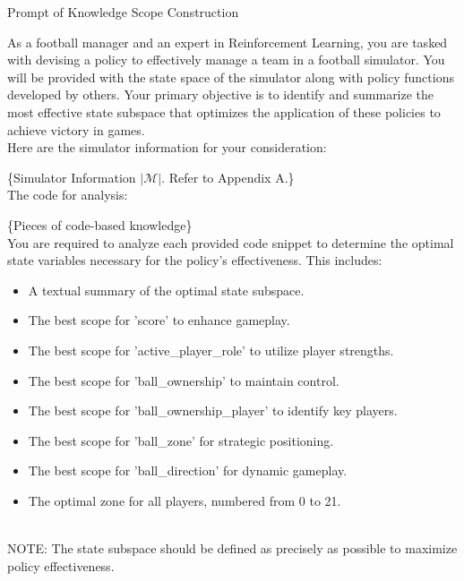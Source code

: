 \begin{gbox}{Prompt of Knowledge Scope Construction}

As a football manager and an expert in Reinforcement Learning, you are tasked with devising a policy to effectively manage a team in a football simulator. You will be provided with the state space of the simulator along with policy functions developed by others. Your primary objective is to identify and summarize the most effective state subspace that optimizes the application of these policies to achieve victory in games.
~\\

Here are the simulator information for your consideration:

\hspace{10mm} 
\{Simulator Information $|\mathcal{M}|$. Refer to Appendix A.\}
~\\

The code for analysis:

\hspace{10mm} \{Pieces of code-based knowledge\}
~\\

You are required to analyze each provided code snippet to determine the optimal state variables necessary for the policy's effectiveness. This includes:
\begin{itemize}
    \item A textual summary of the optimal state subspace.
    \item The best scope for 'score' to enhance gameplay.
    \item The best scope for 'active\_player\_role' to utilize player strengths.
    \item The best scope for 'ball\_ownership' to maintain control.
    \item The best scope for 'ball\_ownership\_player' to identify key players.
    \item The best scope for 'ball\_zone' for strategic positioning.
    \item The best scope for 'ball\_direction' for dynamic gameplay.
    \item The optimal zone for all players, numbered from 0 to 21.
\end{itemize}
~\\

NOTE: The state subspace should be defined as precisely as possible to maximize policy effectiveness.
~\\


\end{gbox}
